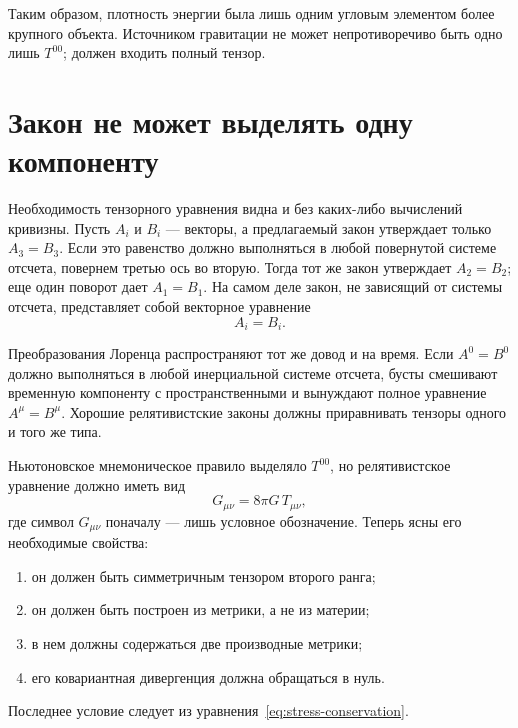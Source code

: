 \begin{classroomqa}
\end{classroomqa}

Таким образом, плотность энергии была лишь одним угловым элементом более крупного объекта. Источником гравитации не может непротиворечиво быть одно лишь \(T^{00}\); должен входить полный тензор.

\section{Закон не может выделять одну компоненту}

Необходимость тензорного уравнения видна и без каких-либо вычислений кривизны. Пусть \(A_i\) и \(B_i\) — векторы, а предлагаемый закон утверждает только \(A_3=B_3\). Если это равенство должно выполняться в любой повернутой системе отсчета, повернем третью ось во вторую. Тогда тот же закон утверждает \(A_2=B_2\); еще один поворот дает \(A_1=B_1\). На самом деле закон, не зависящий от системы отсчета, представляет собой векторное уравнение
\begin{equation}
 A_i=B_i.
\end{equation}

Преобразования Лоренца распространяют тот же довод и на время. Если \(A^0=B^0\) должно выполняться в любой инерциальной системе отсчета, бусты смешивают временную компоненту с пространственными и вынуждают полное уравнение \(A^\mu=B^\mu\). Хорошие релятивистские законы должны приравнивать тензоры одного и того же типа.

Ньютоновское мнемоническое правило выделяло \(T^{00}\), но релятивистское уравнение должно иметь вид
\begin{equation}
 G_{\mu\nu}=8\pi G\,T_{\mu\nu},
 \label{eq:field-schematic}
\end{equation}
где символ \(G_{\mu\nu}\) поначалу — лишь условное обозначение. Теперь ясны его необходимые свойства:
\begin{enumerate}
 \item он должен быть симметричным тензором второго ранга;
 \item он должен быть построен из метрики, а не из материи;
 \item в нем должны содержаться две производные метрики;
 \item его ковариантная дивергенция должна обращаться в нуль.
\end{enumerate}
Последнее условие следует из уравнения~\eqref{eq:stress-conservation}.

